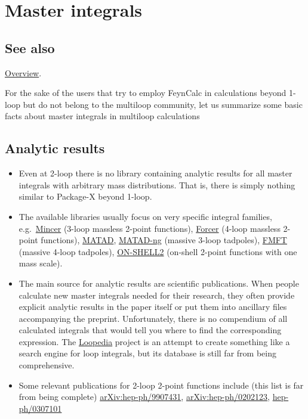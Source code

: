 \documentclass[../FeynCalcManual.tex]{subfiles}
\begin{document}
\hypertarget{master integrals}{
\section{Master integrals}\label{master integrals}}

\subsection{See also}

\hyperlink{toc}{Overview}.

For the sake of the users that try to employ FeynCalc in calculations
beyond 1-loop but do not belong to the multiloop community, let us
summarize some basic facts about master integrals in multiloop
calculations

\hypertarget{analytic-results}{%
\subsection{Analytic results}\label{analytic-results}}

\begin{itemize}
\item
  Even at 2-loop there is no library containing analytic results for all
  master integrals with arbitrary mass distributions. That is, there is
  simply nothing similar to Package-X beyond 1-loop.
\item
  The available libraries usually focus on very specific integral
  families,
  e.g.~\href{https://www.nikhef.nl/~form/maindir/packages/mincer/mincer.html}{Mincer}
  (3-loop massless 2-point functions),
  \href{https://github.com/benruijl/forcer}{Forcer} (4-loop massless
  2-point functions),
  \href{https://www.ttp.kit.edu/~ms/software.html}{MATAD},
  \href{https://github.com/apik/matad-ng}{MATAD-ng} (massive 3-loop
  tadpoles), \href{https://github.com/apik/fmft}{FMFT} (massive 4-loop
  tadpoles),
  \href{http://theor.jinr.ru/~kalmykov/onshell2/onshell2.html}{ON-SHELL2}
  (on-shell 2-point functions with one mass scale).
\item
  The main source for analytic results are scientific publications. When
  people calculate new master integrals needed for their research, they
  often provide explicit analytic results in the paper itself or put
  them into ancillary files accompanying the preprint. Unfortunately,
  there is no compendium of all calculated integrals that would tell you
  where to find the corresponding expression. The
  \href{https://arxiv.org/abs/1709.01266}{Loopedia} project is an
  attempt to create something like a search engine for loop integrals,
  but its database is still far from being comprehensive.
\item
  Some relevant publications for 2-loop 2-point functions include (this
  list is far from being complete)
  \href{https://arxiv.org/abs/hep-ph/9907431}{arXiv:hep-ph/9907431},
  \href{https://arxiv.org/abs/hep-ph/0202123v2}{arXiv:hep-ph/0202123},
  \href{https://arxiv.org/abs/hep-ph/0307101v1}{hep-ph/0307101}
\end{itemize}
\end{document}
